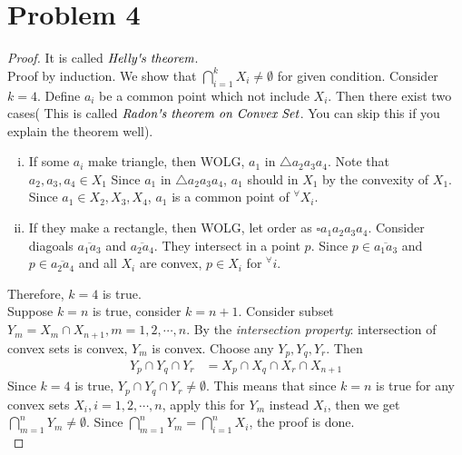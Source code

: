 \section*{Problem 4}
\begin{proof}
	It is called $\textit{Helly\textquotesingle s theorem}$.\\
	Proof by induction. We show that $\bigcap\limits_{i=1}^{k} X_i\neq\emptyset$ for given condition. Consider $k = 4$. Define $a_i$ be a common point which not include $X_i$. Then there exist two cases( This is called $\textit{Radon\textquotesingle s theorem on Convex Set}$. You can skip this if you explain the theorem well).\\
	\begin{enumerate} [i)]
		\item If some $a_i$ make triangle, then WOLG, $a_1$ in $\triangle a_2a_3a_4$. Note that $a_2, a_3, a_4 \in X_1$ Since $a_1$ in $\triangle a_2a_3a_4$, $a_1$ should in $X_1$ by the convexity of $X_1$. Since $a_1 \in X_2, X_3, X_4$, $a_1$ is a common point of $^\forall X_i$.
		\item If they make a rectangle, then WOLG, let order as $\square a_1a_2a_3a_4$. Consider diagoals $\overline{a_1a_3}$ and $\overline{a_2a_4}$. They intersect in a point $p$. Since $p \in \overline{a_1a_3}$ and $p \in \overline{a_2a_4}$ and all $X_i$ are convex, $p \in X_i$ for $^\forall i$.
	\end{enumerate}
	Therefore, $k = 4$ is true.\\
	Suppose $k = n$ is true, consider $k = n + 1$. Consider subset $Y_m = X_m \cap X_{n+1}, m = 1, 2, \cdots, n$. By the \textit{intersection property}: intersection of convex sets is convex, $Y_m$ is convex. Choose any $Y_p, Y_q, Y_r$. Then
	\begin{align*}
		Y_p \cap Y_q \cap Y_r &= X_p \cap X_q \cap X_r \cap X_{n + 1}
	\end{align*}
	Since $k = 4$ is true, $Y_p \cap Y_q \cap Y_r \neq \emptyset$. This means that since $k = n$ is true for any convex sets $X_i, i=1, 2, \cdots, n$, apply this for $Y_m$ instead $X_i$, then we get $\bigcap\limits_{m=1}^{n}Y_m\neq\emptyset$. Since $\bigcap\limits_{m=1}^{n}Y_m = \bigcap\limits_{i=1}^{n}X_i$, the proof is done.\\
\end{proof}
